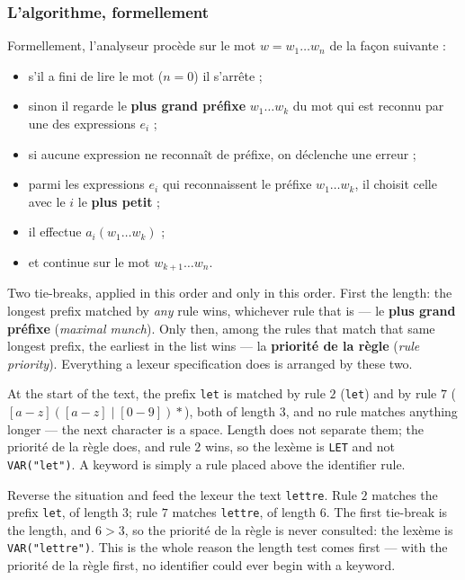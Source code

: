 \subsubsection{L'algorithme, formellement}
\begin{definition}
  Formellement, l'analyseur procède sur le mot $w = w_1 \ldots w_n$ de la façon
  suivante :
  \begin{itemize}
    \item s'il a fini de lire le mot ($n = 0$) il s'arrête ;
    \item sinon il regarde le \textbf{plus grand préfixe} $w_1 \ldots w_k$ du
      mot qui est reconnu par une des expressions $e_i$ ;
    \item si aucune expression ne reconnaît de préfixe, on déclenche une
      erreur ;
    \item parmi les expressions $e_i$ qui reconnaissent le préfixe
      $w_1 \ldots w_k$, il choisit celle avec le $i$ le \textbf{plus petit} ;
    \item il effectue $a_i(w_1 \ldots w_k)$ ;
    \item et continue sur le mot $w_{k+1} \ldots w_n$.
  \end{itemize}
\end{definition}

Two tie-breaks, applied in this order and only in this order. First the length:
the longest prefix matched by \emph{any} rule wins, whichever rule that is ---
le \textbf{plus grand préfixe} (\textit{maximal munch}). Only then, among the
rules that match that same longest prefix, the earliest in the list wins ---
la \textbf{priorité de la règle} (\textit{rule priority}). Everything a lexeur
specification does is arranged by these two.

\begin{example}
  At the start of the text, the prefix \texttt{let} is matched by rule $2$
  (\texttt{let}) and by rule $7$ ($[a-z]([a-z] \mid [0-9]){*}$), both of length
  $3$, and no rule matches anything longer --- the next character is a space.
  Length does not separate them; the priorité de la règle does, and rule $2$
  wins, so the lexème is \texttt{LET} and not \texttt{VAR("let")}. A keyword is
  simply a rule placed above the identifier rule.
\end{example}

\begin{example}
  Reverse the situation and feed the lexeur the text \texttt{lettre}. Rule $2$
  matches the prefix \texttt{let}, of length $3$; rule $7$ matches
  \texttt{lettre}, of length $6$. The first tie-break is the length, and $6 > 3$,
  so the priorité de la règle is never consulted: the lexème is
  \texttt{VAR("lettre")}. This is the whole reason the length test comes first
  --- with the priorité de la règle first, no identifier could ever begin with a
  keyword.
\end{example}

